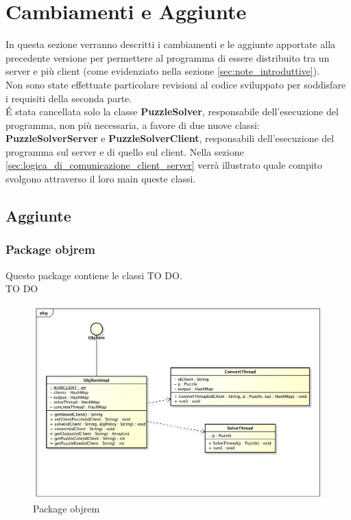 % 
%
%


\section{Cambiamenti e Aggiunte} %
\label{sec:cambiamenti_e_aggiunte}
In questa sezione verranno descritti i cambiamenti e le aggiunte apportate alla precedente versione per permettere al programma di essere distribuito tra un server e più client (come evidenziato nella sezione \ref{sec:note_introduttive}). \\
Non sono state effettuate particolare revisioni al codice sviluppato per soddisfare i requisiti della seconda parte. \\
\'E stata cancellata solo la classe \textbf{PuzzleSolver}, responsabile dell'esecuzione del programma, non più necessaria, a favore di due nuove classi: \textbf{PuzzleSolverServer} e \textbf{PuzzleSolverClient}, responsabili dell'esecuzione del programma sul server e di quello sul client. Nella sezione \ref{sec:logica_di_comunicazione_client_server} verrà illustrato quale compito svolgono attraverso il loro main queste classi.

	\subsection{Aggiunte} %
	\label{sub:aggiunte}
		\subsubsection{Package objrem} %
		\label{ssub:package_objrem}
		Questo package contiene le classi TO DO. \\
		TO DO
		\begin{figure}[htbp]
			\centering
			\centerline{\includegraphics[scale=0.5]{img/objrem.pdf}}
			\caption{Package objrem}
			\label{Package solver}
		\end{figure}
		



